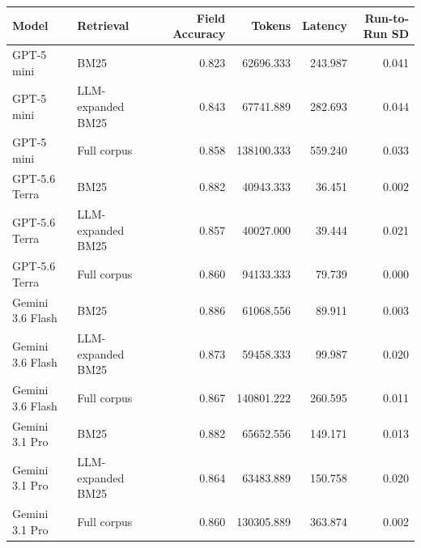 \begin{tabular}{llrrrr}
\toprule
Model & Retrieval & Field Accuracy & Tokens & Latency & Run-to-Run SD \\
\midrule
GPT-5 mini & BM25 & 0.823 & 62696.333 & 243.987 & 0.041 \\
GPT-5 mini & LLM-expanded BM25 & 0.843 & 67741.889 & 282.693 & 0.044 \\
GPT-5 mini & Full corpus & 0.858 & 138100.333 & 559.240 & 0.033 \\
GPT-5.6 Terra & BM25 & 0.882 & 40943.333 & 36.451 & 0.002 \\
GPT-5.6 Terra & LLM-expanded BM25 & 0.857 & 40027.000 & 39.444 & 0.021 \\
GPT-5.6 Terra & Full corpus & 0.860 & 94133.333 & 79.739 & 0.000 \\
Gemini 3.6 Flash & BM25 & 0.886 & 61068.556 & 89.911 & 0.003 \\
Gemini 3.6 Flash & LLM-expanded BM25 & 0.873 & 59458.333 & 99.987 & 0.020 \\
Gemini 3.6 Flash & Full corpus & 0.867 & 140801.222 & 260.595 & 0.011 \\
Gemini 3.1 Pro & BM25 & 0.882 & 65652.556 & 149.171 & 0.013 \\
Gemini 3.1 Pro & LLM-expanded BM25 & 0.864 & 63483.889 & 150.758 & 0.020 \\
Gemini 3.1 Pro & Full corpus & 0.860 & 130305.889 & 363.874 & 0.002 \\
\bottomrule
\end{tabular}
